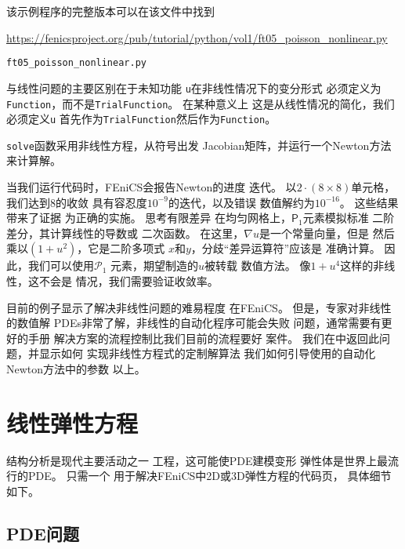 该示例程序的完整版本可以在该文件中找到
\begin{center}
\url{https://fenicsproject.org/pub/tutorial/python/vol1/ft05_poisson_nonlinear.py}
\end{center}
\begin{center}
{\nolinkurl{ft05_poisson_nonlinear.py}}
\end{center}


与线性问题的主要区别在于未知功能
\texttt{u}在非线性情况下的变分形式
必须定义为\texttt{Function}，而不是\texttt{TrialFunction}。 在某种意义上
这是从线性情况的简化，我们必须定义\texttt{u}
首先作为\texttt{TrialFunction}然后作为\texttt{Function}。


\texttt{solve}函数采用非线性方程，从符号出发
Jacobian矩阵，并运行一个Newton方法来计算解。

当我们运行代码时，FEniCS会报告Newton的进度
迭代。 以$2\cdot(8\times 8)$单元格，我们达到8的收敛
具有容忍度$10^{-9}$的迭代，以及错误
数值解约为$10^{-16}$。 这些结果带来了证据
为正确的实施。 思考有限差异
在均匀网格上，$\mathsf{P}_1$元素模拟标准
二阶差分，其计算线性的导数或
二次函数。 在这里，$\nabla u$是一个常量向量，但是
然后乘以$(1+u^2)$，它是二阶多项式
$x$和$y$，分歧“差异运算符”应该是
准确计算。 因此，我们可以使用$\mathcal{P}_1$
元素，期望制造的$u$被转载
数值方法。 像$1+u^4$这样的非线性，这不会是
情况，我们需要验证收敛率。

目前的例子显示了解决非线性问题的难易程度
在FEniCS。 但是，专家对非线性的数值解
PDEs非常了解，非线性的自动化程序可能会失败
问题，通常需要有更好的手册
解决方案的流程控制比我们目前的流程要好
案件。 我们在\cite{ftut2}中返回此问题，并显示如何
实现非线性方程式的定制解算法
我们如何引导使用的自动化Newton方法中的参数
以上。

\section{线性弹性方程}
\label{ftut:elast}


结构分析是现代主要活动之一
工程，这可能使PDE建模变形
弹性体是世界上最流行的PDE。 只需一个
用于解决FEniCS中2D或3D弹性方程的代码页，
具体细节如下。

\subsection{PDE问题}

